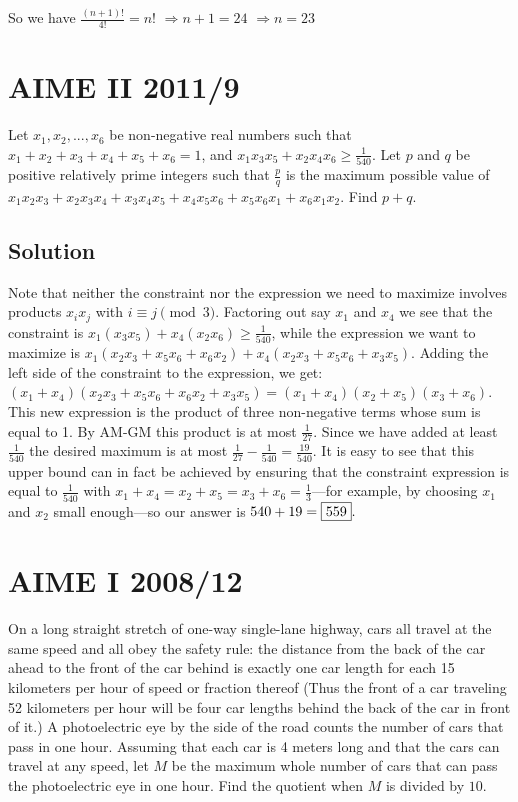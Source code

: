 \documentclass[mast]{lucky}
\begin{document}
So we have $\frac{(n+1)!}{4!} = n!$ $\Longrightarrow  n+1 = 24$ $\Longrightarrow  n = 23$
\pagebreak\section{AIME II 2011/9}
Let $x_1, x_2, ... , x_6$ be non-negative real numbers such that $x_1 +x_2 +x_3 +x_4 +x_5 +x_6 =1$, and $x_1 x_3 x_5 +x_2 x_4 x_6 \ge {\scriptstyle\frac{1}{540}}$. Let $p$ and $q$ be positive relatively prime integers such that $\frac{p}{q}$ is the maximum possible value of $x_1 x_2 x_3 + x_2 x_3 x_4 +x_3 x_4 x_5 +x_4 x_5 x_6 +x_5 x_6 x_1 +x_6 x_1 x_2$. Find $p+q$.
\subsection{Solution}
Note that neither the constraint nor the expression we need to maximize involves products $x_i x_j$ with $i \equiv j \pmod 3$. Factoring out say $x_1$ and $x_4$ we see that the constraint is $x_1(x_3x_5) + x_4(x_2x_6) \ge {\scriptstyle\frac1{540}}$, while the expression we want to maximize is $x_1(x_2x_3 + x_5x_6 + x_6x_2) + x_4(x_2x_3 + x_5x_6 + x_3x_5)$. Adding the left side of the constraint to the expression, we get: $(x_1 + x_4)(x_2x_3 + x_5x_6 + x_6x_2 + x_3x_5) = (x_1 + x_4)(x_2 + x_5)(x_3 + x_6)$. This new expression is the product of three non-negative terms whose sum is equal to 1. By AM-GM this product is at most $\scriptstyle\frac1{27}$. Since we have added at least $\scriptstyle\frac1{540}$ the desired maximum is at most $\scriptstyle\frac1{27} - \frac1{540} = \frac{19}{540}$. It is easy to see that this upper bound can in fact be achieved by ensuring that the constraint expression is equal to $\scriptstyle\frac1{540}$ with $x_1 + x_4 = x_2 + x_5 = x_3 + x_6 = \scriptstyle\frac13$—for example, by choosing $x_1$ and $x_2$ small enough—so our answer is $540 + 19 = \fbox{559}.$
\pagebreak\section{AIME I 2008/12}
On a long straight stretch of one-way single-lane highway, cars all travel at the same speed and all obey the safety rule: the distance from the back of the car ahead to the front of the car behind is exactly one car length for each 15 kilometers per hour of speed or fraction thereof (Thus the front of a car traveling 52 kilometers per hour will be four car lengths behind the back of the car in front of it.) A photoelectric eye by the side of the road counts the number of cars that pass in one hour. Assuming that each car is 4 meters long and that the cars can travel at any speed, let $M$ be the maximum whole number of cars that can pass the photoelectric eye in one hour. Find the quotient when $M$ is divided by $10$.
\end{document}
